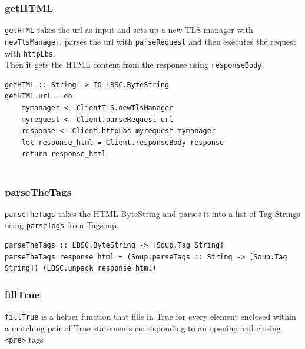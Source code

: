 \documentclass[12pt]{scrreprt}
\begin{document}
\subsubsection{getHTML}
\texttt{getHTML} takes the url as input and sets up a new TLS manager with \texttt{newTlsManager}, parses the url with \texttt{parseRequest} and then executes the request with \texttt{httpLbs}. \\ Then it gets the HTML content from the response using \texttt{responseBody}.

\begin{verbatim}
getHTML :: String -> IO LBSC.ByteString
getHTML url = do
    mymanager <- ClientTLS.newTlsManager
    myrequest <- Client.parseRequest url
    response <- Client.httpLbs myrequest mymanager
    let response_html = Client.responseBody response
    return response_html
    
\end{verbatim}







\subsubsection{parseTheTags}
\texttt{parseTheTags} takes the HTML ByteString and parses it into a list of Tag Strings using \texttt{parseTags} from Tagsoup.

\begin{verbatim}
parseTheTags :: LBSC.ByteString -> [Soup.Tag String]
parseTheTags response_html = (Soup.parseTags :: String -> [Soup.Tag String]) (LBSC.unpack response_html)
\end{verbatim}







\subsubsection{fillTrue}
\texttt{fillTrue} is a helper function that fills in True for every element enclosed within a matching pair of True statements corresponding to an opening and closing \texttt{<pre>} tags
\end{document}
